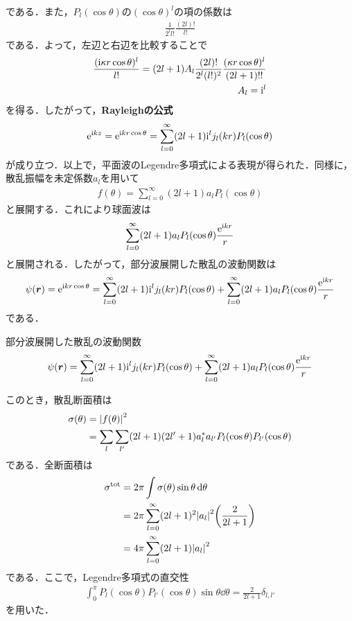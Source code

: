 \documentclass{report}
\begin{document}
  である．また，$P_l(\cos\theta)$の$(\cos\theta)^l$の項の係数は
  \begin{align}
    \frac{1}{2^l l!}\frac{(2l)!}{l!}
  \end{align}
  である．よって，左辺と右辺を比較することで
  \begin{align}
    \frac{(\mathrm{i} \kappa r \cos\theta)^l}{l!} = (2l+1)A_l \frac{(2l)!}{2^l (l!)^2}\frac{(\kappa r \cos\theta)^l}{(2l+1)!!}\\
    A_l = \mathrm{i}^l
  \end{align}
  を得る．したがって，\textbf{Rayleighの公式}
  \begin{align}
    \mathrm{e}^{\mathrm{i} kz} = \mathrm{e}^{\mathrm{i} kr\cos\theta} = \sum_{l=0}^{\infty} (2l+1)\mathrm{i}^l j_l(kr)P_l(\cos\theta)
  \end{align}
  が成り立つ．以上で，平面波のLegendre多項式による表現が得られた．同様に，散乱振幅を未定係数$a_l$を用いて
  \begin{align}
    f(\theta) = \sum_{l=0}^{\infty} (2l+1)a_l P_l(\cos\theta)
  \end{align}
  と展開する．これにより球面波は
  \begin{align}
    \sum_{l=0}^{\infty} (2l+1)a_l P_l(\cos\theta) \frac{\mathrm{e}^{\mathrm{i} kr}}{r}
  \end{align}
  と展開される．したがって，部分波展開した散乱の波動関数は
  \begin{align}
    \psi(\bm{r}) = \mathrm{e}^{\mathrm{i} kr\cos\theta} = \sum_{l=0}^{\infty} (2l+1)\mathrm{i}^l j_l(kr)P_l(\cos\theta) + \sum_{l=0}^{\infty} (2l+1)a_l P_l(\cos\theta) \frac{\mathrm{e}^{\mathrm{i} kr}}{r}
  \end{align}
  である．
  \begin{itembox}[l]{部分波展開した散乱の波動関数}
  \begin{align}
    \label{PartialWave}
    \psi(\bm{r}) = \sum_{l=0}^{\infty} (2l+1)\mathrm{i}^l j_l(kr)P_l(\cos\theta) + \sum_{l=0}^{\infty} (2l+1)a_l P_l(\cos\theta) \frac{\mathrm{e}^{\mathrm{i} kr}}{r}
  \end{align}
  \end{itembox}
  このとき，散乱断面積は
  \begin{align}
    \sigma(\theta) &= \abs{f(\theta)}^2\\
    &= \sum_{l} \sum_{l'} (2l+1)(2l'+1) a_l^{*}a_{l'} P_l(\cos\theta) P_{l'}(\cos\theta)
  \end{align}
  である．全断面積は
  \begin{align}
    \sigma^{\mathrm{tot}} &= 2\pi \int \sigma(\theta) \sin\theta \dd{\theta}\\
    &= 2\pi \sum_{l=0}^{\infty} (2l+1)^2\abs{a_l}^2\qty(\frac{2}{2l+1})\\
    &= 4\pi \sum_{l=0}^{\infty} (2l+1) \abs{a_l}^2
  \end{align}
  である．ここで，Legendre多項式の直交性
  \begin{align}
    \int_{0}^{\pi} P_l(\cos\theta)P_{l'}(\cos\theta) \sin\theta \dd{\theta} = \frac{2}{2l+1}\delta_{l,l'}
  \end{align}
  を用いた．
\end{document}
